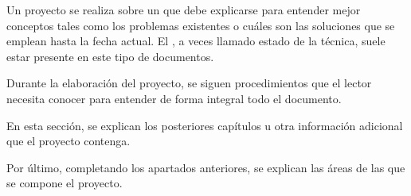 
Un proyecto se realiza sobre un  que debe explicarse para entender mejor conceptos tales como los problemas existentes o cuáles son las soluciones que se emplean hasta la fecha actual. El , a veces llamado estado de la técnica, suele estar presente en este tipo de documentos.


Durante la elaboración del proyecto, se siguen procedimientos que el lector necesita conocer para entender de forma integral todo el documento.


En esta sección, se explican los posteriores capítulos u otra información adicional que el proyecto contenga.


Por último, completando los apartados anteriores, se explican las áreas de las que se compone el proyecto.

\chapterend
